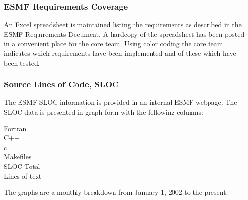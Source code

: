 \subsubsection{ESMF Requirements Coverage}
An Excel spreadsheet is maintained listing the requirements as described in the
ESMF Requirements Document. A hardcopy of the spreadsheet has been posted in a
convenient place for the core team. Using color coding the core team indicates
which requirements have been implemented and of these which have been tested.
\subsubsection{Source Lines of Code, SLOC}
The ESMF SLOC information is provided in an internal ESMF webpage. The
SLOC data is presented in graph form with the following columns:
\begin{description}
\item[Fortran] 
\item[C++] 
\item[c] 
\item[Makefiles] 
\item[SLOC Total] 
\item[Lines of text] 
\end{description}

The graphs are a monthly breakdown from January 1, 2002 to the present.
























